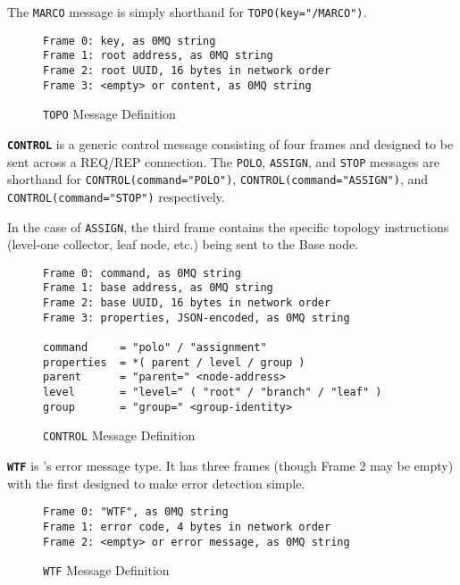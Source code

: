 The \texttt{MARCO} message is simply shorthand for \texttt{TOPO(key="/MARCO")}.

\begin{figure}[H]
\vspace{+10pt}
\begin{verbatim}
Frame 0: key, as 0MQ string
Frame 1: root address, as 0MQ string
Frame 2: root UUID, 16 bytes in network order
Frame 3: <empty> or content, as 0MQ string
\end{verbatim}
\vspace{-20pt}
\caption{\texttt{TOPO} Message Definition}
\label{fig:message_topo}
\end{figure}

\textbf{\texttt{CONTROL}} is a generic control message consisting of four frames and designed to be sent across a
REQ/REP connection. The \texttt{POLO}, \texttt{ASSIGN}, and \texttt{STOP} messages are shorthand for
\texttt{CONTROL(command="POLO")}, \texttt{CONTROL(command="ASSIGN")}, and \texttt{CONTROL(command="STOP")} respectively.

In the case of \texttt{ASSIGN}, the third frame contains the specific topology instructions (level-one collector, leaf
node, etc.) being sent to the Base node.

\begin{figure}[H]
\vspace{+10pt}
\begin{verbatim}
Frame 0: command, as 0MQ string
Frame 1: base address, as 0MQ string
Frame 2: base UUID, 16 bytes in network order
Frame 3: properties, JSON-encoded, as 0MQ string

command     = "polo" / "assignment"
properties  = *( parent / level / group )
parent      = "parent=" <node-address>
level       = "level=" ( "root" / "branch" / "leaf" )
group       = "group=" <group-identity>
\end{verbatim}
\vspace{-20pt}
\caption{\texttt{CONTROL} Message Definition}
\label{fig:message_control}
\end{figure}

\textbf{\texttt{WTF}} is \dcamp's error message type. It has three frames (though Frame 2 may be empty) with the first
designed to make error detection simple.

\begin{figure}[H]
\vspace{+10pt}
\begin{verbatim}
Frame 0: "WTF", as 0MQ string
Frame 1: error code, 4 bytes in network order
Frame 2: <empty> or error message, as 0MQ string
\end{verbatim}
\vspace{-20pt}
\caption{\texttt{WTF} Message Definition}
\label{fig:message_wtf}
\end{figure}
